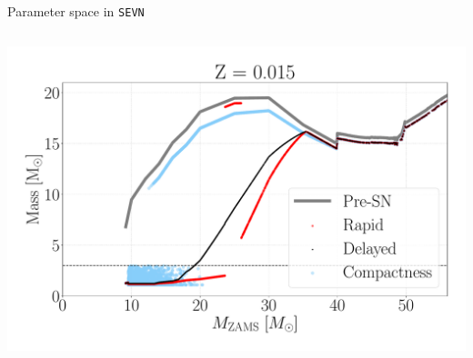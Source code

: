 \documentclass{beamer} %
\begin{document}
\begin{frame}{Parameter space in \texttt{SEVN}}
\begin{columns}
\begin{column}{0.6\textwidth}
			\includegraphics[width=\textwidth]{./images/remnants_Z015_cut.pdf}
		\end{column}	
	\end{columns}
	
\end{frame}
\end{document}
